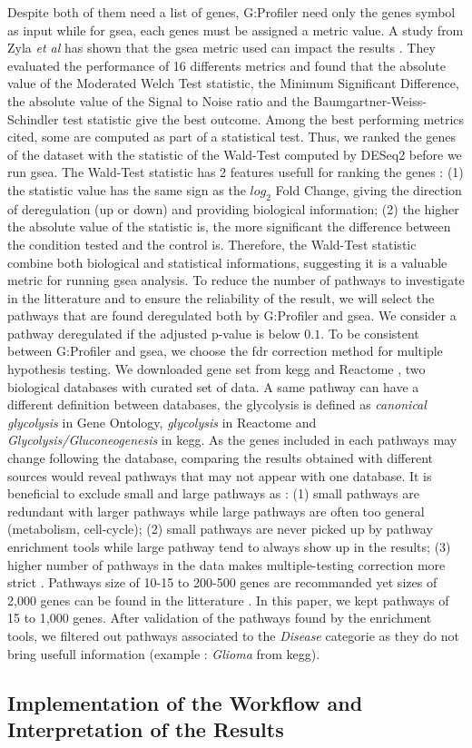 Despite both of them need a list of genes, G:Profiler need only the genes symbol as input while for \acrshort{gsea}, each genes must be assigned a metric value.
A study from Zyla \textit{et al} has shown that the \acrshort{gsea} metric used can impact the results \cite*{Zyla2017}.
They evaluated the performance of 16 differents metrics and found that the absolute value of the Moderated Welch Test statistic, the Minimum Significant Difference, the absolute value of the Signal to Noise ratio and the Baumgartner-Weiss-Schindler test statistic give the best outcome.
Among the best performing metrics cited, some are computed as part of a statistical test.
Thus, we ranked the genes of the dataset with the statistic of the Wald-Test computed by DESeq2 before we run \acrshort{gsea}.
The Wald-Test statistic has 2 features usefull for ranking the genes : (1) the statistic value has the same sign as the $log_2$ Fold Change, giving the direction of deregulation (up or down) and providing biological information; (2) the higher the absolute value of the statistic is, the more significant the difference between the condition tested and the control is.
Therefore, the Wald-Test statistic combine both biological and statistical informations, suggesting it is a valuable metric for running \acrshort{gsea} analysis.
To reduce the number of pathways to investigate in the litterature and to ensure the reliability of the result, we will select the pathways that are found deregulated both by G:Profiler and \acrshort{gsea}.
We consider a pathway deregulated if the adjusted p-value is below $0.1$.
To be consistent between G:Profiler and \acrshort{gsea}, we choose the \acrfull{fdr} correction method for multiple hypothesis testing.
We downloaded gene set from \acrshort{kegg} \cite*{Kanehisa2019} and Reactome \cite*{Gillespie2022}, two biological databases with curated set of data.
A same pathway can have a different definition between databases, the glycolysis is defined as \textit{canonical glycolysis} in Gene Ontology, \textit{glycolysis} in Reactome and \textit{Glycolysis/Gluconeogenesis} in \acrshort{kegg}.
As the genes included in each pathways may change following the database, comparing the results obtained with different sources would reveal pathways that may not appear with one database.
It is beneficial to exclude small and large pathways as : (1) small pathways are redundant with larger pathways while large pathways are often too general (metabolism, cell-cycle); (2) small pathways are never picked up by pathway enrichment tools while large pathway tend to always show up in the results; (3) higher number of pathways in the data makes multiple-testing correction more strict \cite*{Reimand2019}.
Pathways size of 10-15 to 200-500 genes are recommanded yet sizes of 2,000 genes can be found in the litterature \cite*{Reimand2019}.
In this paper, we kept pathways of 15 to 1,000 genes.
After validation of the pathways found by the enrichment tools, we filtered out pathways associated to the \textit{Disease} categorie as they do not bring usefull information (example : \textit{Glioma} from \acrshort{kegg}).

\subsection{Implementation of the Workflow and Interpretation of the Results}

